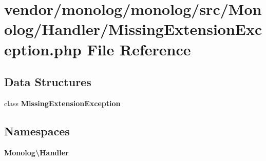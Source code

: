 \section{vendor/monolog/monolog/src/\+Monolog/\+Handler/\+Missing\+Extension\+Exception.php File Reference}
\label{_missing_extension_exception_8php}
\subsection*{Data Structures}
\begin{DoxyCompactItemize}
\item 
class {\bf Missing\+Extension\+Exception}
\end{DoxyCompactItemize}
\subsection*{Namespaces}
\begin{DoxyCompactItemize}
\item 
 {\bf Monolog\textbackslash{}\+Handler}
\end{DoxyCompactItemize}
